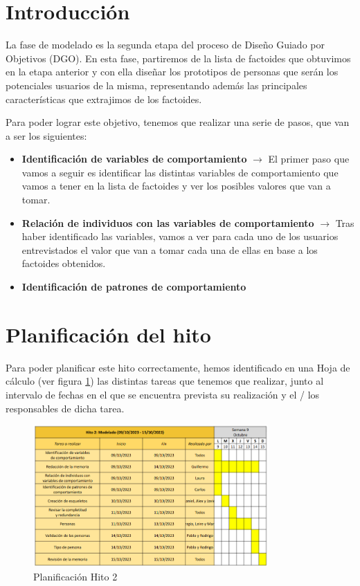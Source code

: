 \section{Introducción}
La fase de modelado es la segunda etapa del proceso de Diseño Guiado por Objetivos (DGO). En esta fase, partiremos de la lista de factoides que
obtuvimos en la etapa anterior y con ella diseñar los prototipos de personas que serán los potenciales usuarios de la misma, representando además
las principales características que extrajimos de los factoides.

Para poder lograr este objetivo, tenemos que realizar una serie de pasos, que van a ser los siguientes:
\begin{itemize}
    \item \textbf{Identificación de variables de comportamiento} $\rightarrow$ El primer paso que vamos a seguir es identificar las distintas variables de comportamiento que vamos a tener en la lista de factoides y ver los posibles valores que van a tomar.
    \item \textbf{Relación de individuos con las variables de comportamiento} $\rightarrow$ Tras haber identificado las variables, vamos a ver para cada uno de los usuarios entrevistados el valor que van a tomar cada una de ellas en base a los factoides obtenidos.
    \item \textbf{Identificación de patrones de comportamiento} 
\end{itemize}

\section{Planificación del hito}
Para poder planificar este hito correctamente, hemos identificado en una Hoja de cálculo (ver figura \ref{fig:planif-hito2}) las distintas tareas que tenemos que 
realizar, junto al intervalo de fechas en el que se encuentra prevista su realización y el / los responsables de dicha tarea.
\begin{figure}[H]
    \centering 
    \includegraphics[width=0.8\textwidth]{./Imagenes/Planificaciones/Planif-hito2.png}
    \caption{Planificación Hito 2}
    \label{fig:planif-hito2}
\end{figure}

